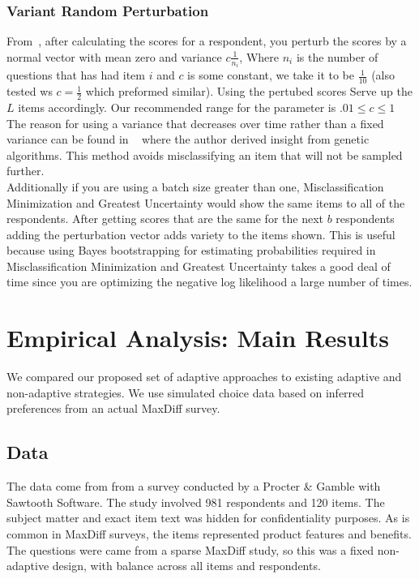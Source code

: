 \documentclass[nonblindrev]{informs3}
\begin{document}
\subsubsection{Variant Random Perturbation}
From~\cite{toubia2007adaptive}, after calculating the scores for a respondent, you perturb the scores by a normal vector with mean zero and variance $c\frac{1}{n_i}$, Where $n_i$ is the number of questions that has had item $i$ and $c$ is some constant, we take it to be $\frac{1}{10}$ (also tested ws $c=\frac{1}{2}$ which preformed similar). Using the pertubed scores Serve up the $L$ items accordingly. Our recommended range for the parameter is $.01 \leq c \leq 1$\\
The reason for using a variance that decreases over time rather than a fixed variance can be found in ~\cite{toubia2007adaptive} where the author derived insight from genetic algorithms. This method avoids misclassifying an item that will not be sampled further.\\
Additionally if you are using a batch size greater than one, Misclassification Minimization and Greatest Uncertainty would show the same items to all of the respondents. After getting scores that are the same for the next $b$ respondents adding the perturbation vector adds variety to the items shown. This is useful because using Bayes bootstrapping for estimating probabilities required in Misclassification Minimization and Greatest Uncertainty takes a good deal of time since you are optimizing the negative log likelihood a large number of times.


\section{Empirical Analysis: Main Results}
\label{sec:empirical_main}
We compared our proposed set of adaptive approaches to existing adaptive and non-adaptive strategies. We use simulated choice data based on inferred preferences from an actual MaxDiff survey.

\subsection{Data}
The data come from from a survey conducted by a Procter \& Gamble with Sawtooth Software. The study involved 981 respondents and 120 items. The subject matter and exact item text was hidden for confidentiality purposes. As is common in MaxDiff surveys, the items represented product features and benefits. The questions were came from a sparse MaxDiff study, so this was a fixed non-adaptive design, with balance across all items and respondents. 
\end{document}
